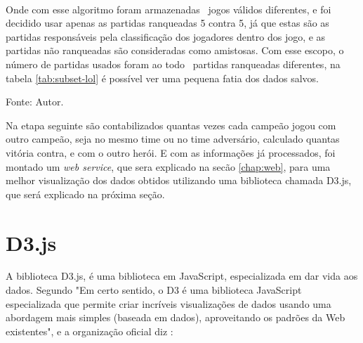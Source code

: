 \

Onde com esse algoritmo foram armazenadas \numpartidas\ jogos válidos diferentes, e foi decidido usar apenas as partidas ranqueadas 5 contra 5, já que estas são as partidas responsáveis pela classificação dos jogadores dentro dos jogo, e as partidas não ranqueadas são consideradas como amistosas.
Com esse escopo, o número de partidas usados foram ao todo \partidasrankeds\ partidas ranqueadas diferentes, na tabela \ref{tab:subset-lol} é possível ver uma pequena fatia dos dados salvos.


\begin{table}[H]
\centering
\caption{Exemplo de \textit{subset} salvo no banco de dados}
\label{tab:subset-lol}
\small{Fonte: Autor.}
\end{table}

Na etapa seguinte são contabilizados quantas vezes cada campeão jogou com outro campeão, seja no mesmo time ou no time adversário, calculado quantas vitória contra, e com o outro herói.
E com as informações já processados, foi montado um \textit{web service}, que sera explicado na secão \ref{chap:web}, para uma melhor visualização dos dados obtidos utilizando uma biblioteca chamada D3.js, que será explicado na próxima seção.

\section{D3.js}
A biblioteca D3.js, é uma biblioteca em JavaScript, especializada em dar vida aos dados. Segundo \citet{d3cook} "Em certo sentido, o D3 é uma biblioteca JavaScript especializada que permite criar incríveis
visualizações de dados usando uma abordagem mais simples (baseada em dados), aproveitando os padrões da Web existentes", e a organização oficial diz :


